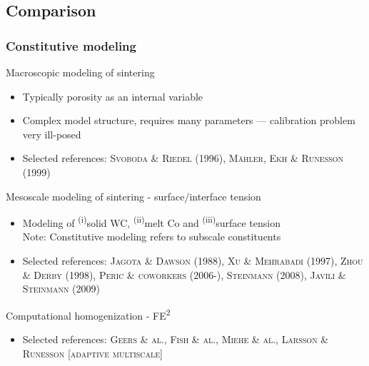 \documentclass[11pt]{beamer} %
\newcommand{\roughcite}[1]{\textsc{#1}}
\begin{document}
\subsection{Comparison}
\begin{frame}
 \frametitle{Constitutive modeling}
 Macroscopic modeling of sintering
 \begin{itemize}
  \item Typically porosity as an internal variable
  \item Complex model structure, requires many parameters --- calibration problem very ill-posed
  \item Selected references: \roughcite{Svoboda \& Riedel (1996)}, \roughcite{Mähler, Ekh \& Runesson (1999)}
 \end{itemize}

Mesoscale modeling of sintering - surface/interface tension
 \begin{itemize}
 \item Modeling of \textsuperscript{(i)}solid WC, \textsuperscript{(ii)}melt Co and \textsuperscript{(iii)}surface tension\\
  Note: Constitutive modeling refers to subscale constituents
  \item Selected references: \roughcite{Jagota \& Dawson (1988)}, \roughcite{Xu \& Mehrabadi (1997)}, \roughcite{Zhou \& Derby (1998)}, \roughcite{Peric \& coworkers (2006-)}, \roughcite{Steinmann (2008)}, \roughcite{Javili \& Steinmann (2009)}
 \end{itemize}

Computational homogenization - FE\textsuperscript{2}
\begin{itemize}
  \item Selected references:  \roughcite{Geers \& al.},  \roughcite{Fish \& al.},
 \roughcite{Miehe \& al.}, \roughcite{Larsson \& Runesson [adaptive multiscale]}
\end{itemize}
\end{frame}


\end{document}
